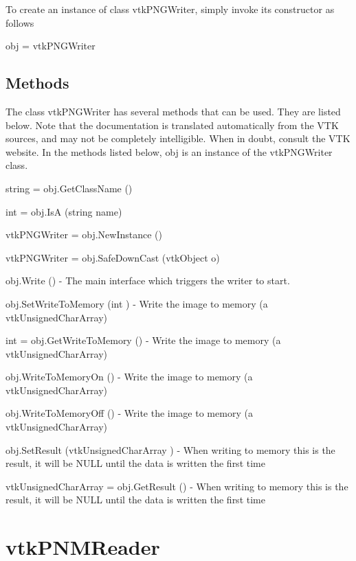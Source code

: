 To create an instance of class vtk\-P\-N\-G\-Writer, simply invoke its constructor as follows \begin{DoxyVerb}  obj = vtkPNGWriter
\end{DoxyVerb}
 \hypertarget{vtkwidgets_vtkxyplotwidget_Methods}{}\subsection{Methods}\label{vtkwidgets_vtkxyplotwidget_Methods}
The class vtk\-P\-N\-G\-Writer has several methods that can be used. They are listed below. Note that the documentation is translated automatically from the V\-T\-K sources, and may not be completely intelligible. When in doubt, consult the V\-T\-K website. In the methods listed below, {\ttfamily obj} is an instance of the vtk\-P\-N\-G\-Writer class. 
\begin{DoxyItemize}
\item {\ttfamily string = obj.\-Get\-Class\-Name ()}  
\item {\ttfamily int = obj.\-Is\-A (string name)}  
\item {\ttfamily vtk\-P\-N\-G\-Writer = obj.\-New\-Instance ()}  
\item {\ttfamily vtk\-P\-N\-G\-Writer = obj.\-Safe\-Down\-Cast (vtk\-Object o)}  
\item {\ttfamily obj.\-Write ()} -\/ The main interface which triggers the writer to start.  
\item {\ttfamily obj.\-Set\-Write\-To\-Memory (int )} -\/ Write the image to memory (a vtk\-Unsigned\-Char\-Array)  
\item {\ttfamily int = obj.\-Get\-Write\-To\-Memory ()} -\/ Write the image to memory (a vtk\-Unsigned\-Char\-Array)  
\item {\ttfamily obj.\-Write\-To\-Memory\-On ()} -\/ Write the image to memory (a vtk\-Unsigned\-Char\-Array)  
\item {\ttfamily obj.\-Write\-To\-Memory\-Off ()} -\/ Write the image to memory (a vtk\-Unsigned\-Char\-Array)  
\item {\ttfamily obj.\-Set\-Result (vtk\-Unsigned\-Char\-Array )} -\/ When writing to memory this is the result, it will be N\-U\-L\-L until the data is written the first time  
\item {\ttfamily vtk\-Unsigned\-Char\-Array = obj.\-Get\-Result ()} -\/ When writing to memory this is the result, it will be N\-U\-L\-L until the data is written the first time  
\end{DoxyItemize}\hypertarget{vtkio_vtkpnmreader}{}\section{vtk\-P\-N\-M\-Reader}\label{vtkio_vtkpnmreader}

